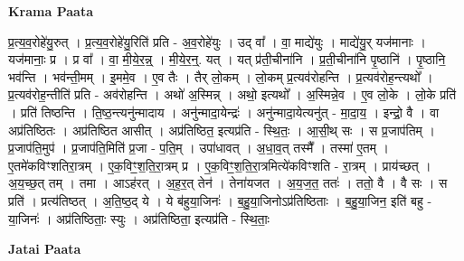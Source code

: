 \documentclass[17pt]{extarticle}
\begin{document}
\textbf{Krama Paata} \newline

प्र॒त्य॒व॒रोहे॑यु॒रुत् । प्र॒त्य॒व॒रोहे॑यु॒रिति॑ प्रति - अ॒व॒रोहे॑युः । उद् वा᳚ । वा॒ माद्ये॑युः । माद्ये॑यु॒र् यज॑मानाः । यज॑मानाः॒ प्र । प्र वा᳚ । वा॒ मी॒ये॒र॒न्न्॒ । मी॒ये॒र॒न्॒. यत् । यत् प्र॑ती॒चीना॑नि । प्र॒ती॒चीना॑नि पृ॒ष्ठानि॑ । पृ॒ष्ठानि॒ भव॑न्ति । भव॑न्ती॒मम् । इ॒ममे॒व । ए॒व तैः । तैर् लो॒कम् । लो॒कम् प्र॒त्यव॑रोहन्ति । प्र॒त्यव॑रोह॒न्त्यथो᳚ । प्र॒त्यव॑रोह॒न्तीति॑ प्रति - अव॑रोहन्ति । अथो॑ अ॒स्मिन्न् । अथो॒ इत्यथो᳚ । अ॒स्मिन्ने॒व । ए॒व लो॒के । लो॒के प्रति॑ । प्रति॑ तिष्ठन्ति । ति॒ष्ठ॒न्त्यनु॑न्मादाय । अनु॑न्मादा॒येन्द्रः॑ । अनु॑न्मादा॒येत्यनु॑त् - मा॒दा॒य॒ । इन्द्रो॒ वै । वा अप्र॑तिष्ठितः । अप्र॑तिष्ठित आसीत् । अप्र॑तिष्ठित॒ इत्यप्र॑ति - स्थि॒तः॒ । आ॒सी॒थ् सः । स प्र॒जाप॑तिम् । प्र॒जाप॑ति॒मुप॑ । प्र॒जाप॑ति॒मिति॑ प्र॒जा - प॒ति॒म् । उपा॑धावत् । अ॒धा॒व॒त् तस्मै᳚ । तस्मा॑ ए॒तम् । ए॒तमे॑कविꣳशतिरा॒त्रम् । ए॒क॒विꣳ॒॒श॒ति॒रा॒त्रम् प्र । ए॒क॒विꣳ॒॒श॒ति॒रा॒त्रमित्ये॑कविꣳशति - रा॒त्रम् । प्राय॑च्छत् । अ॒य॒च्छ॒त् तम् । तमा । आऽह॑रत् । अ॒ह॒र॒त् तेन॑ । तेना॑यजत । अ॒य॒ज॒त॒ ततः॑ । ततो॒ वै । वै सः । स प्रति॑ । प्रत्य॑तिष्ठत् । अ॒ति॒ष्ठ॒द् ये । ये ब॑हुया॒जिनः॑ । ब॒हु॒या॒जिनोऽप्र॑तिष्ठिताः । ब॒हु॒या॒जिन॒ इति॑ बहु - या॒जिनः॑ । अप्र॑तिष्ठिताः॒ स्युः । अप्र॑तिष्ठिता॒ इत्यप्र॑ति - स्थि॒ताः॒ \newline

\textbf{Jatai Paata} \newline
\end{document}
